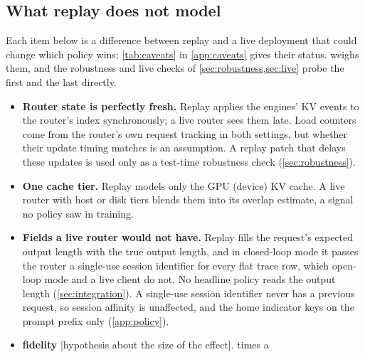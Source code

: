 \subsection{What replay does not model}
\label{sec:replay-gaps}

Each item below is a difference between replay and a live deployment that could change which
policy wins; \cref{tab:caveats} in \cref{app:caveats} gives their status.  weighs them, and the
robustness and live checks of \cref{sec:robustness,sec:live} probe the first and the last directly.
\begin{itemize}
  \item \textbf{Router state is perfectly fresh.} Replay applies the engines' KV events to the
    router's index synchronously; a live router sees them late. Load counters come from the
    router's own request tracking in both settings, but whether their update timing matches is
    an assumption. A replay patch that delays these updates is used only as a test-time
    robustness check (\cref{sec:robustness}).
  \item \textbf{One cache tier.} Replay models only the GPU (device) KV cache. A live router with
    host or disk tiers blends them into its overlap estimate, a signal no policy saw in training.
  \item \textbf{Fields a live router would not have.} Replay fills the request's expected output
    length with the true output length, and in closed-loop mode it passes the router a single-use
    session identifier for every flat trace row, which open-loop mode and a live client do not.
    No headline policy reads the output length (\cref{sec:integration}). A single-use session
    identifier never has a previous request, so session affinity is unaffected, and the 
    home indicator keys on the prompt prefix only (\cref{app:policy}).
  \item \textbf{\ais{} fidelity} [hypothesis about the size of the effect]. \ais{} times a

\end{itemize}
